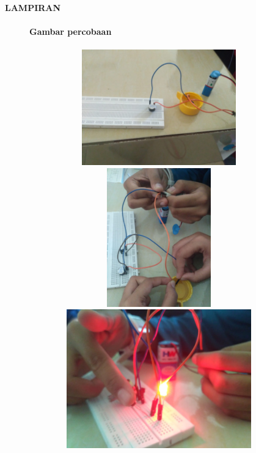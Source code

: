 \documentclass[12pt,a4paper]{article}
\begin{document}
\newpage
\begin{center}
\large{\textbf{LAMPIRAN}}
\end{center}

\newpage
\begin{figure}
\paragraph{Gambar percobaan}
\paragraph{ }
\begin{center}

\includegraphics[width=12cm, height=5cm]{per1.png}

\includegraphics[width=12cm, height=6cm]{per2.png}

\includegraphics[width=12cm, height=6cm]{per4a.png}
\end{center}
\end{figure}
\vspace{2cm}
\end{document}
